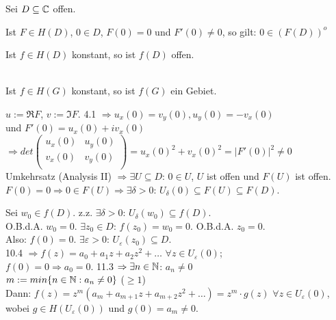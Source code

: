 \documentclass[a4paper,twoside,DIV15,BCOR12mm]{scrbook}
\begin{document}
\begin{satz}
Sei $D \subseteq \mathbb{C}$ offen.
\begin{liste}
\item Ist $F \in H(D)$, $0 \in D$, $F(0) = 0$ und $F'(0) \neq 0$, so gilt: $0 \in {(F(D))}^o$
\item Ist $f \in H(D)$  konstant, so ist $f(D)$ offen.
\item {}\\
Ist $f \in H(G)$  konstant, so ist $f(G)$ ein Gebiet.
\end{liste}
\end{satz}

\begin{beweis}
\begin{liste}
\item $u := \Re F$, $v := \Im F$. 4.1 $\Rightarrow u_x(0) = v_y(0), u_y(0) = - v_x(0)$ \\
und $F'(0) = u_x(0) + i v_x(0)$\\
$\Rightarrow det 
\left( \begin{array}{ccc}
u_x(0) & u_y(0) \\
v_x(0) & v_y(0) \\
\end{array} \right)
= u_x(0)^2 + v_x(0)^2 = |F'(0)|^2 \neq 0$\\
Umkehrsatz (Analysis II) $\Rightarrow \exists U \subseteq D$: $0 \in U$, $U$ ist offen und $F(U)$ ist offen.
$F(0) = 0 \Rightarrow 0 \in F(U) \Rightarrow \exists \delta > 0$: $U_{\delta}(0) \subseteq F(U) \subseteq F(D)$.
\item Sei $w_0 \in f(D)$. z.z. $\exists \delta > 0$: $U_{\delta}(w_0) \subseteq f(D)$.\\
O.B.d.A. $w_0 = 0$. $\exists z_0 \in D$: $f(z_0) = w_0 = 0$. O.B.d.A. $z_0 = 0$.\\
Also: $f(0) = 0$. $\exists \varepsilon > 0$: $U_{\varepsilon}(z_0) \subseteq D$.\\
10.4 $\Rightarrow f(z) = a_0 + a_1 z + a_2 z^2 + \dots$  $\forall z \in U_{\varepsilon}(0)$;\\
$f(0) = 0 \Rightarrow a_0 = 0$. 11.3 $\Rightarrow \exists n \in \mathbb{N}$: $a_n \neq 0$\\
$m:= min \{n \in \mathbb{N} : a_n \neq 0 \}$ ($\geq 1$)\\
Dann: $f(z) = z^m (a_m + a_{m+1} z + a_{m+2} z^2 + \dots) = z^m \cdot g(z)$  $\forall z \in U_{\varepsilon}(0)$,\\
wobei $g \in H(U_{\varepsilon}(0))$ und $g(0) = a_m \neq 0$.\\

\end{liste}
\end{beweis}
\end{document}
